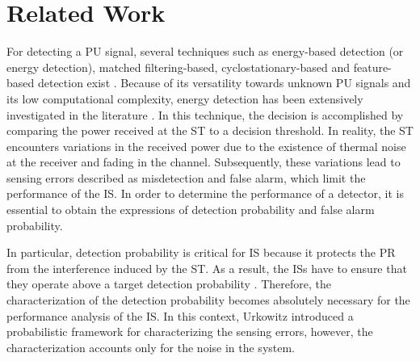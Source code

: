 \section{Related Work}



For detecting a PU signal, several techniques such as energy-based detection (or energy detection), matched filtering-based, cyclostationary-based and feature-based detection exist \cite{Sharma15, Axell12}. Because of its versatility towards unknown PU signals and its low computational complexity, energy detection has been extensively investigated in the literature \cite{Urkowitz, Kostylev02, Alouini03, Herath09, Mariani10}. In this technique, the decision is accomplished by comparing the power received at the ST to a decision threshold. In reality, the ST encounters variations in the received power due to the existence of thermal noise at the receiver and fading in the channel. Subsequently, these variations lead to sensing errors described as misdetection and false alarm, %
which limit the performance of the IS. In order to determine the performance of a detector, it is essential to obtain the expressions of detection probability and false alarm probability.

In particular, detection probability is critical for IS because it protects the PR from the interference induced by the ST. As a result, the ISs have to ensure that they operate above a target detection probability \cite{peh07}. Therefore, the characterization of the detection probability becomes absolutely necessary for the performance analysis of the IS. In this context, Urkowitz \cite{Urkowitz} introduced a probabilistic framework for characterizing the sensing errors, however, the characterization accounts only for the noise in the system. 

